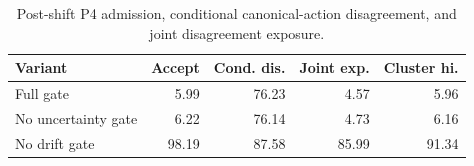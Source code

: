 
\begin{table}[t]
\caption{Post-shift P4 admission, conditional canonical-action disagreement, and joint disagreement exposure.}
\label{tab:drift-gate}
\centering
\scriptsize
\setlength{\tabcolsep}{2pt}
\begin{tabular}{lrrrr}
\toprule
Variant & Accept & Cond. dis. & Joint exp. & Cluster hi. \\
\midrule
Full gate & 5.99 & 76.23 & 4.57 & 5.96 \\
No uncertainty gate & 6.22 & 76.14 & 4.73 & 6.16 \\
No drift gate & 98.19 & 87.58 & 85.99 & 91.34 \\
\bottomrule
\end{tabular}
\end{table}

